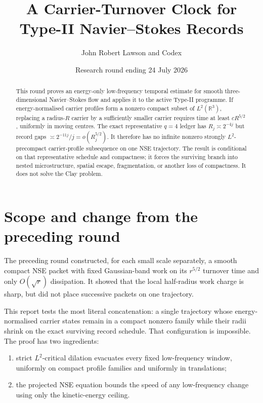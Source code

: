 \documentclass[11pt]{article}
\title{A Carrier-Turnover Clock for Type-II Navier--Stokes Records}
\author{John Robert Lawson and Codex}
\date{Research round ending 24 July 2026}
\theoremstyle{remark}
\newcommand{\R}{\mathbb R}
\begin{document}
\maketitle

\begin{abstract}
This round proves an energy-only low-frequency temporal estimate for smooth
three-dimensional Navier--Stokes flow and applies it to the active Type-II
programme.  If energy-normalised carrier profiles form a nonzero compact
subset of \(L^2(\R^3)\), replacing a radius-\(R\) carrier by a sufficiently
smaller carrier requires time at least \(cR^{5/2}\), uniformly in moving
centres.  The exact representative \(q=4\) ledger has
\(R_j\asymp2^{-4j}\) but record gaps
\(\asymp2^{-11j}/j=o(R_j^{5/2})\).  It therefore has no infinite nonzero
strongly \(L^2\)-precompact carrier-profile subsequence on one NSE trajectory.
The result is conditional
on that representative schedule and compactness; it forces the surviving
branch into nested microstructure, spatial escape, fragmentation, or another
loss of compactness.  It does not solve the Clay problem.
\end{abstract}

\section{Scope and change from the preceding round}

The preceding round constructed, for each small scale separately, a smooth
compact NSE packet with fixed Gaussian-band work on its \(r^{5/2}\) turnover
time and only \(O(\sqrt r)\) dissipation.  It showed that the local
half-radius work charge is sharp, but did not place successive packets on
one trajectory.

This report tests the most literal concatenation: a single trajectory whose
energy-normalised carrier states remain in a compact nonzero family while
their radii shrink on the exact surviving record schedule.  That
configuration is impossible.  The proof has two ingredients:

\begin{enumerate}
\item strict \(L^2\)-critical dilation evacuates every fixed low-frequency
window, uniformly on compact profile families and uniformly in translations;
\item the projected NSE equation bounds the speed of any low-frequency
change using only the kinetic-energy ceiling.
\end{enumerate}
\end{document}
